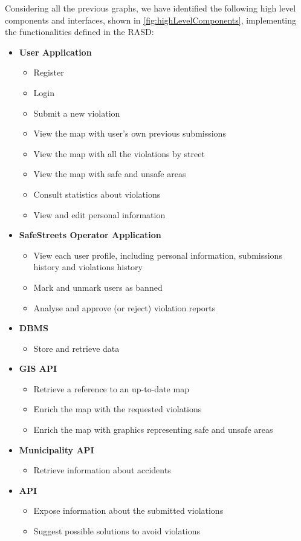 Considering all the previous graphs, we have identified the following high level components and interfaces, shown in \autoref{fig:highLevelComponents}, implementing the functionalities defined in the RASD:
\begin{itemize}

	\item \textbf{User Application}
	\begin{itemize}
		\item Register
		\item Login
		\item Submit a new violation
		\item View the map with user's own previous submissions
		\item View the map with all the violations by street
		\item View the map with safe and unsafe areas
		\item Consult statistics about violations
		\item View and edit personal information
	\end{itemize}
	\clearpage
	\item \textbf{SafeStreets Operator Application}
	\begin{itemize}
		\item View each user profile, including personal information, submissions history and violations history
		\item Mark and unmark users as banned
		\item Analyse and approve (or reject) violation reports
	\end{itemize}
	
	\item \textbf{DBMS}
	\begin{itemize}
		\item Store and retrieve data
	\end{itemize}	
	
	\item \textbf{GIS API}
	\begin{itemize}
		\item Retrieve a reference to an up-to-date map
		\item Enrich the map with the requested violations
		\item Enrich the map with graphics representing safe and unsafe areas
	\end{itemize}
	
	\item \textbf{Municipality API}
	\begin{itemize}
		\item Retrieve information about accidents
	\end{itemize}
	
	\item \textbf{API}
	\begin{itemize}
		\item Expose information about the submitted violations
		\item Suggest possible solutions to avoid violations
	\end{itemize}
\end{itemize}
\clearpage

